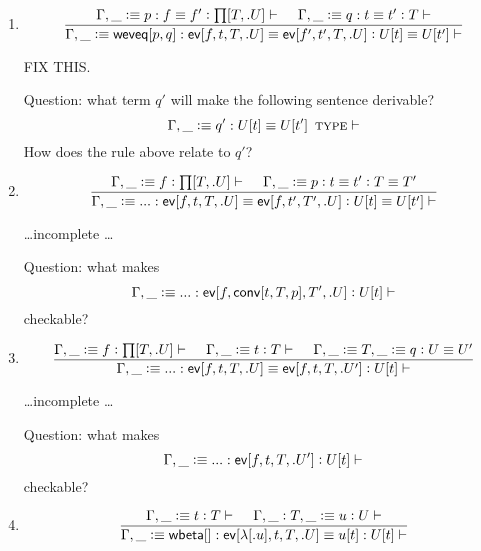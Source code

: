 \documentclass[11pt]{article}
\newcommand{\eqd}{\equiv}
\newcommand{\spc}{{\,\,\,\,\,\,\,}}
\newcommand{\ccolon}{\vcentcolon}
\newcommand{\ccheck}{\vcentcolon}            %
\newcommand{\Type}{\mathop{\text{ \sc type}}}
\newcommand{\Okay}{\mathop{\text{ \sc okay}}}
\newcommand{\Context}{\vdash\Okay}
\renewcommand{\Context}{\vdash}
\newcommand{\ha}[2]{#1[#2]}
\newcommand{\annot}{{\sf annot}}
\newcommand{\haa}[2]{\ha\annot{#1,#2}}
\renewcommand{\haa}[2]{#1}
\newcommand{\conv}{{\sf conv}}
\newcommand{\ev}{{\sf ev}}
\newcommand{\wbeta}{{\sf wbeta}}
\newcommand{\weveq}{{\sf weveq}}
\newcommand{\var}{\char`_}
\newcommand{\defn}{\vcentcolon\equiv}
\begin{document}
\begin{enumerate}
Here $U[o]$ is notation for replacing the first variable of $U$ by $o$, with
the second variable of $U$ becoming the first, and so on.  

The relation $U' = U[\haa t T]$ between type expressions indicates equality up to
renaming of local variables and expansion of definitions.


Question: what makes the sentence $$\Gamma, \var \defn U[\haa t T] \Type
\Context$$ checkable?

\item 
\[\frac{
   \Gamma, \var\defn p : f \eqd f' \ccolon{\ha\prod{T,.U}} \Context
   \spc 
   \Gamma, \var\defn q : t \eqd t' \ccolon T \Context
   }{
   \Gamma, \var\defn \ha\weveq{p,q} : \ha\ev{f,t,T,.U} \eqd \ha\ev{f',t',T,.U}
   \ccolon U[\haa t T] \eqd U[\haa {t'} T] \Context
  }\]

FIX THIS.

Question: what term $q'$ will make the following sentence derivable?
$$ \Gamma, \var \defn q' : U[\haa t T] \eqd U[\haa {t'} T] \Type \Context $$
How does the rule above relate to $q'$?

\item 
\[\frac{
  \Gamma, \var\defn f \ccheck{\ha\prod{T,.U}} \Context
  \spc
  \Gamma, \var\defn p \ccolon t \eqd t' \ccolon T \eqd T'
}{
  \Gamma, \var\defn ... : \ha\ev{f,t,T,.U} \eqd \ha\ev{f,t',T',.U} \ccolon U[\haa t T] \eqd U[\haa {t'} T] \Context
}\]

\dots incomplete \dots

Question: what makes $$\Gamma, \var\defn ... : \ha\ev{f,\ha\conv{t,T,p},T',.U}
\ccolon U[\haa t T] \Context$$ checkable?

\item 
\[\frac{
  \Gamma, \var\defn f \ccheck{\ha\prod{T,.U}} \Context
  \spc 
  \Gamma, \var\defn t \ccheck{T}\Context
  \spc
  \Gamma, \var\defn T, \var\defn q \ccolon U \eqd U'
}{
  \Gamma, \var\defn ... : \ha\ev{f,t,T,.U} \eqd \ha\ev{f,t,T,.U'}
   \ccolon U[\haa t T] \Context
}\]

\dots incomplete \dots

Question: what makes $$ \Gamma, \var\defn ... : \ha\ev{f,t,T,.U'}
\ccolon U[\haa t T] \Context $$ checkable?

\item 
\[\frac{
  \Gamma, \var\defn t \ccheck{T} \Context
  \spc
  \Gamma, \var \ccolon T, \var\defn u \ccheck{U} \Context
  }{
  \Gamma,\var\defn \ha\wbeta{} : \ha\ev{\ha\lambda{.u},t,T,.U} \eqd
  u[\haa{t}{T}] : U[\haa{t}{T}] \Context
}\]


\end{enumerate}
\end{document}
